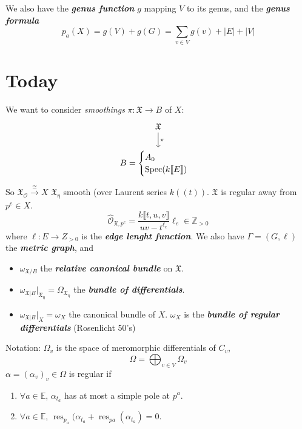 We also have the \textit{\textbf{genus function}} $g$ mapping $V$ to its genus, and the \textit{\textbf{genus formula}}
 \[p_a(X)=g(V)+g(G)=\sum_{v\in V}g(v)+|E| +|V|\]


 \section{Today}
 We want to consider \textit{smoothings}  $\pi:\mathfrak{X} \longrightarrow B$ of $X$:
 \[\begin{tikzcd}
 \mathfrak{X}\arrow[d,"\pi"]\\
 B=\begin{cases}
 	A_0\\
 	\operatorname{Spec}(k\llbracket E\rrbracket)
 \end{cases}
 \end{tikzcd}\]
 So $\mathfrak{X}_\mathcal{O}\xrightarrow{\cong }X$ $\mathfrak{X}_\eta$ smooth (over Laurent series $k(\!(t)\!)$. $\mathfrak{X}$ is regular away from $p^e\in X$.
 \[\hat{\mathcal{O}}_{\mathfrak{X},p^e}=\dfrac{k\llbracket t,u,v\rrbracket}{uv-t^{\ell_e}}\ell_e\in\mathbb{Z}_{>0}\]
 where $\ell:E\longrightarrow Z_{>0}$ is the \textit{\textbf{edge lenght function}}. We also have $\Gamma=(G,\ell)$ the \textit{\textbf{metric graph}}, and
\begin{itemize}
\item $\omega_{\mathfrak{X} /B}$ the \textit{\textbf{relative canonical bundle }}on  $\mathfrak{X}$.
\item $\omega_{\mathfrak{X} |B}|_{\mathfrak{X}_\eta}=\Omega_{\mathfrak{X}_\eta}$ the \textit{\textbf{bundle of differentials}}.
 \item $\omega_{\mathfrak{X} |B}|_{X}=\omega_X$ the canonical bundle of $X$. $\omega_X$ is the \textit{\textbf{bundle of regular differentials}} (Rosenlicht 50's)
\end{itemize}

\begin{idea5}{Notation:}\leavevmode
	 $\Omega_v$ is the space of meromorphic differentials of $C_v$, 
	  \[\Omega=\bigoplus_{v\in V} \Omega_v \]
	  $\alpha=(\alpha_{v})_{v}\in\Omega$ is regular if
	  \begin{enumerate}
	  	\item $\forall a\in\mathbb{E}$, $\alpha_{t_a}$ has at most a simple pole at $p^a$.
		\item $\forall a\in\mathbb{E}$, $\operatorname{res}_{p_a}(\alpha_{t_a}+\operatorname{res}_{pa}(\alpha_{t_a})=0$.
	  \end{enumerate}
\end{idea5}

